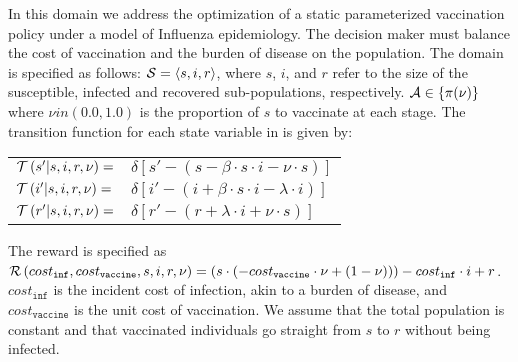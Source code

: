In this domain we address the optimization of a static parameterized vaccination policy under a model of Influenza epidemiology. The decision maker must balance the cost of vaccination and the burden of disease on the population. The domain is specified as follows: {\footnotesize $ \mathcal{S} = \left\langle s, i, r \right\rangle$}, where $ s $, $ i $, and $ r $ refer to the size of the susceptible, infected and recovered sub-populations, respectively. {\footnotesize $ \mathcal{A} \in \left\lbrace \pi(\nu) \right\rbrace $} where {\footnotesize $\nu in (0.0, 1.0)$} is the proportion of $ s $ to vaccinate at each stage. The transition function {\footnotesize \Transition} for each state variable in {\footnotesize \State} is given by:
    {\footnotesize 
        \abovedisplayskip=5pt
        \belowdisplayskip=0pt
        \renewcommand{\arraystretch}{1.5}
        \begin{tabular}{ll}
            $ \mathcal{T}\left( s' | s, i, r, \nu \right) =$ & $ \delta \left[ s' - (s - \beta \cdot s \cdot i - \nu \cdot s) \right] $ \\
            $ \mathcal{T}\left( i' | s, i, r, \nu \right) =$ & $ \delta \left[ i' - (i + \beta \cdot s \cdot i - \lambda \cdot i) \right] $ \\
            $ \mathcal{T}\left( r' | s, i, r, \nu \right) =$ & $ \delta \left[ r' - (r + \lambda \cdot i + \nu \cdot s) \right] $ \\            
        \end{tabular}
    }%
   
The reward is specified as {\footnotesize $ \mathcal{R}\left(cost_{\mathtt{inf}}, cost_{\mathtt{vaccine}}, s, i, r, \nu \right) = (s \cdot (-cost_{\mathtt{vaccine}} \cdot \nu + (1 - \nu))) - cost_{\mathtt{inf}} \cdot i + r$}. {\footnotesize $ cost_{\mathtt{inf}} $} is the incident cost of infection, akin to a burden of disease, and {\footnotesize $ cost_{\mathtt{vaccine}} $} is the unit cost of vaccination. We assume that the total population is constant and that vaccinated individuals go straight from {\footnotesize $ s $} to {\footnotesize $ r $} without being infected. 


